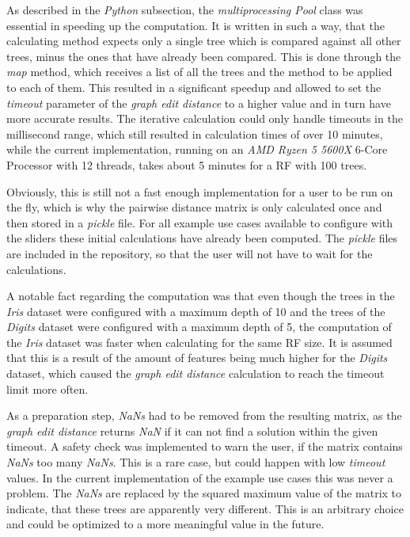 \documentclass[a4paper, 12pt]{article}
\begin{document}
As described in the \textit{Python} subsection, the \textit{multiprocessing Pool} class was
essential in speeding up the computation. It is written in such a way, that the calculating method
expects only a single tree which is compared against all other trees, minus the ones that
have already been compared. This is done through the \textit{map} method, which receives a list
of all the trees and the method to be applied to each of them. This resulted in a significant
speedup and allowed to set the \textit{timeout} parameter of the \textit{graph edit distance}
to a higher value and in turn have more accurate results. The iterative calculation could only
handle timeouts in the millisecond range, which still resulted in calculation times of over 10
minutes, while the current implementation, running on an \textit{AMD Ryzen 5 5600X} 6-Core
Processor with 12 threads, takes about 5 minutes for a RF with 100 trees. \par

Obviously, this is still not a fast enough implementation for a user to be run on the fly, which
is why the pairwise distance matrix is only calculated once and then stored in a \textit{pickle}
file. For all example use cases available to configure with the sliders these initial calculations
have already been computed. The \textit{pickle} files are included in the repository, so that the user
will not have to wait for the calculations. \par

A notable fact regarding the computation was that even though the trees in the \textit{Iris} dataset
were configured with a maximum depth of 10 and the trees of the \textit{Digits} dataset were
configured with a maximum depth of 5, the computation of the \textit{Iris} dataset was
faster when calculating for the same RF size. It is assumed that this is a result of the amount
of features being much higher for the \textit{Digits} dataset, which caused the \textit{graph edit
    distance} calculation to reach the timeout limit more often. \par

As a preparation step, \textit{NaNs} had to be removed from the resulting matrix, as the
\textit{graph edit distance} returns \textit{NaN} if it can not find a solution within the given
timeout. A safety check was implemented to warn the user, if the matrix contains \textit{NaNs}
too many \textit{NaNs}. This is a rare case, but could happen with low \textit{timeout} values.
In the current implementation of the example use cases this was never a problem.
The \textit{NaNs} are replaced by the squared maximum value of the matrix to indicate, that these
trees are apparently very different. This is an arbitrary choice and could be optimized to a
more meaningful value in the future. \par
\end{document}
